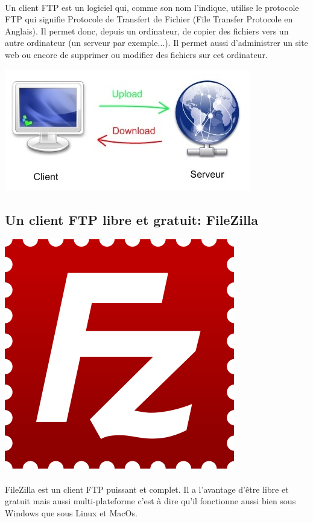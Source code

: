 \documentclass[10pt,a4paper]{article}
\begin{document}
\paragraph{}Un client FTP est un logiciel qui, comme son nom l'indique, utilise le protocole FTP qui signifie Protocole de Transfert de Fichier (File Transfer Protocole en Anglais). Il permet donc, depuis un ordinateur, de copier des fichiers vers un autre ordinateur (un serveur par exemple...). Il permet aussi d'administrer un site web ou encore de supprimer ou modifier des fichiers sur cet ordinateur.
\begin{center}
\includegraphics[scale=0.7]{img/0010.jpg}
\end{center}

\subsection{Un client FTP libre et gratuit: FileZilla}
\begin{center}
\includegraphics[scale=0.1]{img/0011.png}
\end{center}
\paragraph{}FileZilla est un client FTP puissant et complet. Il a l'avantage d'être libre et gratuit mais aussi multi-plateforme c'est à dire qu'il fonctionne aussi bien sous Windows que sous Linux et MacOs.
\end{document}
